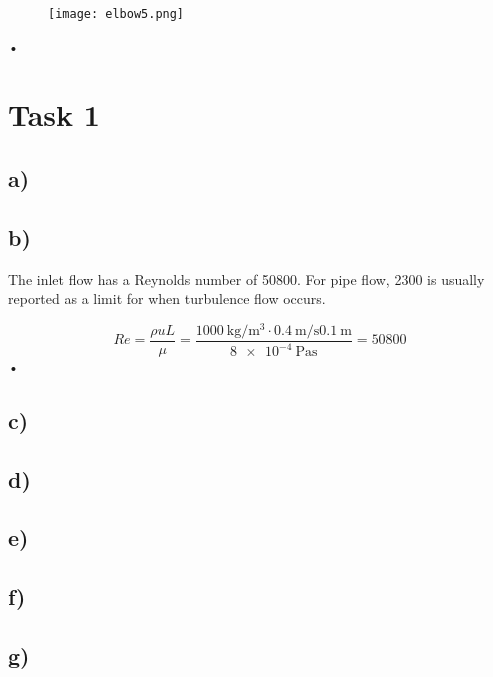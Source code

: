 \documentclass{article}
\begin{document}
\begin{figure}
\texttt{[image: elbow5.png]}
\end{figure}•

\section{Task 1}

\subsection{a)}

\subsection{b)}
The inlet flow has a Reynolds number of 50800. For pipe flow, 2300 is usually reported as a limit for when turbulence flow occurs.

\begin{equation}
Re = \frac{\rho u L}{\mu} = \frac{\SI{1000}{\kilogram\per\meter^3}\cdot\SI{0.4}{\meter\per\second}\SI{0.1}{\meter}}{\SI{8e-4}{\pascal\second}} = 50800
\end{equation}•

\subsection{c)}

\subsection{d)}

\subsection{e)}

\subsection{f)}

\subsection{g)}
\end{document}
